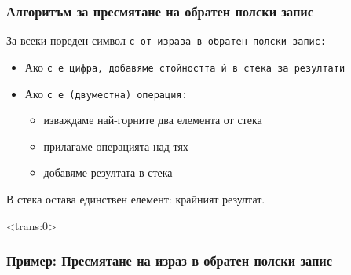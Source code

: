 \documentclass[alsotrans]{beamerswitch}
\begin{document}
\begin{frame}
  \frametitle{Алгоритъм за пресмятане на обратен полски запис}
  За всеки пореден символ \tt c от израза в обратен полски запис:\pause
  \begin{itemize}[<+->]
  \item Ако \tt c е цифра, добавяме стойността ѝ в стека за резултати
  \item Ако \tt c е (двуместна) операция:
    \begin{itemize}
    \item изваждаме най-горните два елемента от стека
    \item прилагаме операцията над тях
    \item добавяме резултата в стека
    \end{itemize}
  \end{itemize}
  \onslide<+->
  В стека остава единствен елемент: крайният резултат.
\end{frame}

\begin{frame}<trans:0>
  \frametitle{Пример: Пресмятане на израз в обратен полски запис}

  \begin{center}
  \end{center}
\end{frame}
\end{document}
